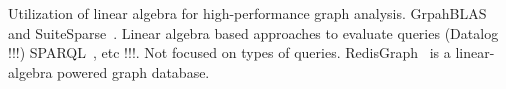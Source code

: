 Utilization of linear algebra for high-performance graph analysis.
GrpahBLAS~\cite{!!!} and SuiteSparse~\cite{!!!}.
Linear algebra based approaches to evaluate queries (Datalog !!!) SPARQL~\cite{10.1145/3302424.3303962,DBLP:journals/corr/MetzlerM15a}, etc !!!. 
Not focused on types of queries.
RedisGraph~\cite{!!!} is a linear-algebra powered graph database.

